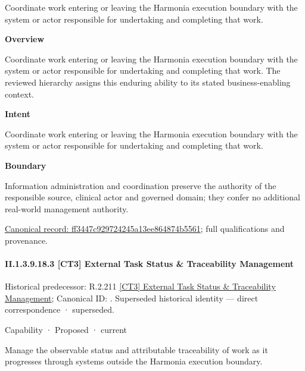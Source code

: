 Coordinate work entering or leaving the Harmonia execution boundary with the system or actor responsible for undertaking and completing that work.



\textbf{Overview}



Coordinate work entering or leaving the Harmonia execution boundary with the system or actor responsible for undertaking and completing that work. The reviewed hierarchy assigns this enduring ability to its stated business-enabling context.



\textbf{Intent}



Coordinate work entering or leaving the Harmonia execution boundary with the system or actor responsible for undertaking and completing that work.



\textbf{Boundary}



Information administration and coordination preserve the authority of the responsible source, clinical actor and governed domain; they confer no additional real-world management authority.


{\footnotesize \href{../../../../continuum/strategy/capability/ff3447c929724245a13ee864874b5561.md}{Canonical record: ff3447c929724245a13ee864874b5561}; full qualifications and provenance.}\par
\paragraph*{II.1.3.9.18.3 [CT3] External Task Status \& Traceability Management}
\label{navigation:II.1.3.9.18.3}

{\small Historical predecessor: R.2.211 \hyperref[element:95985d244a234571892a9e9b4024f594]{[CT3] External Task Status \& Traceability Management}; Canonical ID: \texttt{}. Superseded historical identity — direct correspondence · superseded.}\par
\label{element:b25bb04a8aa94dcfac105a646878ccfc}
{\small Capability · Proposed · current}\par

Manage the observable status and attributable traceability of work as it progresses through systems outside the Harmonia execution boundary.




